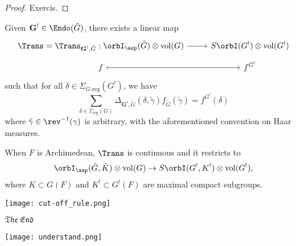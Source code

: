 \documentclass[11pt, a3paper, openany]{article}
\newcommand{\mes}{\operatorname{vol}}
\theoremstyle{remark}
\theoremstyle{remark}
\theoremstyle{remark}
\newenvironment{Proof of claim}
  {\begin{proof}[\normalfont \textbf{Proof of claim}]}
  {\end{proof}}
\begin{document}
\begin{proof}
    Exercis.
\end{proof}
\begin{theorem}{}{}
	Given $\mathbf{G}^! \in \Endo(\tilde{G})$, there exists a linear map
	\[\begin{tikzcd}[row sep=tiny]
		\Trans = \Trans_{\mathbf{G}^!, \tilde{G}}: \orbI_{\asp}(\tilde{G}) \otimes \mes(G) \arrow[r] & S\orbI(G^!) \otimes \mes(G^!)\\
		f \arrow[mapsto, r]& f^{G^!}
	\end{tikzcd}\]
	such that for all $\delta \in \Sigma_{G\text{-reg}}(G^!)$, we have
	\[ \sum_{\delta \in \Gamma_{\mathrm{reg}}(G)} \Delta_{\mathbf{G}^!, \tilde{G}}(\delta, \tilde{\gamma}) f_{\tilde{G}}(\tilde{\gamma}) = f^{G^!}(\delta) \]
	where $\tilde{\gamma} \in \rev^{-1}(\gamma)$ is arbitrary, with the aforementioned convention on Haar measures.
	
	When $F$ is Archimedean, $\Trans$ is continuous and it restricts to
	\[ \orbI_{\asp}(\tilde{G}, \tilde{K}) \otimes \mes(G) \to S\orbI(G^!, K^!) \otimes \mes(G^!), \]
	where $K \subset G(F)$ and $K^! \subset G^!(F)$ are maximal compact subgroups.
\end{theorem}

\vspace{2.333ex}
\begin{center}
	\texttt{[image: cut-off\_rule.png]}
	\vspace{-5ex}
\end{center}
\hfill {\Large $\mathfrak{The\ End}$ \Coffeecup}
\vspace{5.555ex}
\begin{center}
	\texttt{[image: understand.png]}
\end{center}
\end{document}
